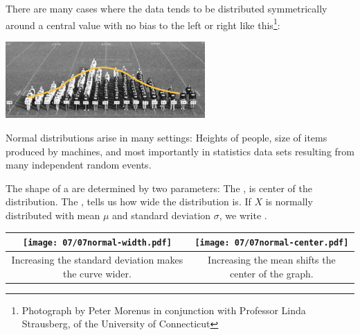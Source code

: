 \begin{multicols}{2}
There are many cases where the data tends to be distributed symmetrically around a central value with no bias to the left or
right like this\footnote{Photograph by Peter Morenus in conjunction with Professor Linda Strausberg, of the University of Connecticut}:  %

\columnbreak

\begin{center} \includegraphics[width=3in]{07/07people.png}\end{center}

\end{multicols}

Normal distributions arise in many settings: Heights of people, size of items produced by machines, and most importantly in statistics data sets resulting from many independent random events. \medskip

\begin{tcolorbox}

The shape of a \textbf{} are determined by two parameters:
\bi
\ii The , is center of the distribution.
\ii The , tells us how wide the distribution is.
\ii If $X$ is normally distributed with mean $\mu$ and standard deviation $\sigma$, we write .
\ei

\end{tcolorbox}

\begin{tabular}{|c|c|}
\hline
\texttt{[image: 07/07normal-width.pdf]} & \texttt{[image: 07/07normal-center.pdf]}\\
\hline
{\scriptsize Increasing the standard deviation makes the curve wider.} &
{\scriptsize Increasing the mean shifts the center of the graph.} \\
\hline
\end{tabular}


\clearpage


